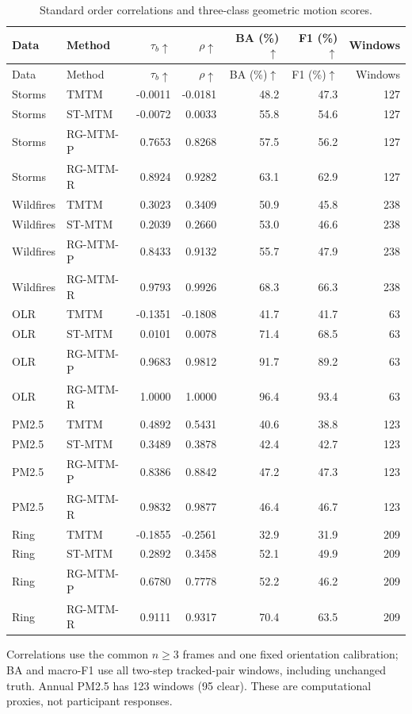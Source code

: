 \begingroup\small\setlength{\tabcolsep}{4pt}
\begin{longtable}{llrrrrr}
\caption{Standard order correlations and three-class geometric motion scores.}\label{tab:standard_tasks}\\\toprule
Data & Method & $\tau_b\uparrow$ & $\rho\uparrow$ & BA (\%)$\uparrow$ & F1 (\%)$\uparrow$ & Windows\\\midrule\endfirsthead
\toprule Data & Method & $\tau_b\uparrow$ & $\rho\uparrow$ & BA (\%)$\uparrow$ & F1 (\%)$\uparrow$ & Windows\\\midrule\endhead
\bottomrule\endfoot
Storms & TMTM & -0.0011 & -0.0181 & 48.2 & 47.3 & 127\\
Storms & ST-MTM & -0.0072 & 0.0033 & 55.8 & 54.6 & 127\\
Storms & RG-MTM-P & 0.7653 & 0.8268 & 57.5 & 56.2 & 127\\
Storms & RG-MTM-R & 0.8924 & 0.9282 & 63.1 & 62.9 & 127\\
Wildfires & TMTM & 0.3023 & 0.3409 & 50.9 & 45.8 & 238\\
Wildfires & ST-MTM & 0.2039 & 0.2660 & 53.0 & 46.6 & 238\\
Wildfires & RG-MTM-P & 0.8433 & 0.9132 & 55.7 & 47.9 & 238\\
Wildfires & RG-MTM-R & 0.9793 & 0.9926 & 68.3 & 66.3 & 238\\
OLR & TMTM & -0.1351 & -0.1808 & 41.7 & 41.7 & 63\\
OLR & ST-MTM & 0.0101 & 0.0078 & 71.4 & 68.5 & 63\\
OLR & RG-MTM-P & 0.9683 & 0.9812 & 91.7 & 89.2 & 63\\
OLR & RG-MTM-R & 1.0000 & 1.0000 & 96.4 & 93.4 & 63\\
PM2.5 & TMTM & 0.4892 & 0.5431 & 40.6 & 38.8 & 123\\
PM2.5 & ST-MTM & 0.3489 & 0.3878 & 42.4 & 42.7 & 123\\
PM2.5 & RG-MTM-P & 0.8386 & 0.8842 & 47.2 & 47.3 & 123\\
PM2.5 & RG-MTM-R & 0.9832 & 0.9877 & 46.4 & 46.7 & 123\\
Ring & TMTM & -0.1855 & -0.2561 & 32.9 & 31.9 & 209\\
Ring & ST-MTM & 0.2892 & 0.3458 & 52.1 & 49.9 & 209\\
Ring & RG-MTM-P & 0.6780 & 0.7778 & 52.2 & 46.2 & 209\\
Ring & RG-MTM-R & 0.9111 & 0.9317 & 70.4 & 63.5 & 209\\
\end{longtable}
\noindent Correlations use the common $n\ge3$ frames and one fixed orientation calibration; BA and macro-F1 use all two-step tracked-pair windows, including unchanged truth. Annual PM2.5 has 123 windows (95 clear). These are computational proxies, not participant responses.\endgroup
